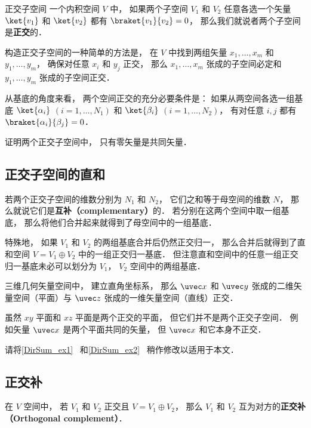 

\begin{definition}{正交子空间}
一个内积空间 $V$ 中， 如果两个子空间 $V_1$ 和 $V_2$ 任意各选一个矢量 $\ket{v_1}$ 和 $\ket{v_2}$ 都有 $\braket{v_1}{v_2} = 0$， 那么我们就说者两个子空间是\textbf{正交}的．
\end{definition}

构造正交子空间的一种简单的方法是， 在 $V$ 中找到两组矢量 $x_1, \dots, x_m$ 和 $y_1, \dots, y_m$， 确保对任意 $x_i$ 和 $y_j$ 正交， 那么 $x_1, \dots, x_m$ 张成的子空间必定和 $y_1, \dots, y_m$ 张成的子空间正交．%

\begin{theorem}{}
从基底的角度来看， 两个空间正交的充分必要条件是： 如果从两空间各选一组基底 $\ket{\alpha_i}$ $(i = 1, \dots, N_1)$ 和 $\ket{\beta_i}$ $(i = 1, \dots, N_2)$， 有对任意 $i, j$ 都有 $\braket{\alpha_i}{\beta_j} = 0$．
\end{theorem}

\begin{exercise}{}
证明两个正交子空间中， 只有零矢量是共同矢量．
\end{exercise}

\subsection{正交子空间的直和}

若两个正交子空间的维数分别为 $N_1$ 和 $N_2$， 它们之和等于母空间的维数 $N$， 那么就说它们是\textbf{互补（complementary）}的． 若分别在这两个空间中取一组基底， 那么将他们合并起来就得到了母空间中的一组基底．

特殊地， 如果 $V_1$ 和 $V_2$ 的两组基底合并后仍然正交归一， 那么合并后就得到了直和空间 $V = V_1 \oplus V_2$ 中的一组正交归一基底． 但注意直和空间中的任意一组正交归一基底未必可以划分为 $V_1$， $V_2$ 空间中的两组基底．

\begin{example}{}
三维几何矢量空间中， 建立直角坐标系， 那么 $\uvec x$ 和 $\uvec y$ 张成的二维矢量空间（平面）与 $\uvec z$ 张成的一维矢量空间（直线）正交．
\end{example}

\begin{example}{}
虽然 $xy$ 平面和 $xz$ 平面是两个正交的平面， 但它们并不是两个正交子空间． 例如矢量 $\uvec x$ 是两个平面共同的矢量， 但 $\uvec x$ 和它本身不正交．
\end{example}

\begin{exercise}{}
请将\autoref{DirSum_ex1}~ 和\autoref{DirSum_ex2}~ 稍作修改以适用于本文．
\end{exercise}

\subsection{正交补}
在 $V$ 空间中， 若 $V_1$ 和 $V_2$ 正交且 $V = V_1 \oplus V_2$， 那么 $V_1$ 和 $V_2$ 互为对方的\textbf{正交补（Orthogonal complement）}．
